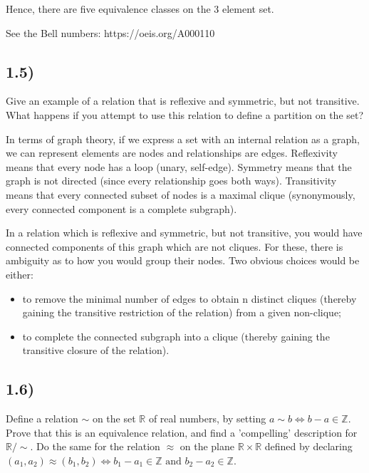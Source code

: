 \documentclass[12pt, letterpaper, twoside]{report}
\begin{document}
Hence, there are five equivalence classes on the 3 element set.

See the Bell numbers: https://oeis.org/A000110



\subsection*{1.5)}

Give an example of a relation that is reflexive and symmetric, but not transitive. What happens if you attempt to use this relation to define a partition on the set?

In terms of graph theory, if we express a set with an internal relation as a graph, we can represent elements are nodes and relationships are edges. Reflexivity means that every node has a loop (unary, self-edge). Symmetry means that the graph is not directed (since every relationship goes both ways). Transitivity means that every connected subset of nodes is a maximal clique (synonymously, every connected component is a complete subgraph).

In a relation which is reflexive and symmetric, but not transitive, you would have connected components of this graph which are not cliques. For these, there is ambiguity as to how you would group their nodes. Two obvious choices would be either:

\begin{itemize}
	\item to remove the minimal number of edges to obtain n distinct cliques (thereby gaining the transitive restriction of the relation) from a given non-clique;

	\item to complete the connected subgraph into a clique (thereby gaining the transitive closure of the relation).
\end{itemize}



\subsection*{1.6)}

Define a relation $\sim$ on the set $\mathbb{R}$ of real numbers, by setting $a \sim b \Leftrightarrow b - a \in \mathbb{Z}$. Prove that this is an equivalence relation, and find a 'compelling' description for $\mathbb{R}/\sim$. Do the same for the relation $\approx$ on the plane $\mathbb{R} \times \mathbb{R}$ defined by declaring $(a_1, a_2) \approx (b_1, b_2) \Leftrightarrow b_1 - a_1 \in \mathbb{Z} \text{ and } b_2 - a_2 \in \mathbb{Z}$.
\end{document}
